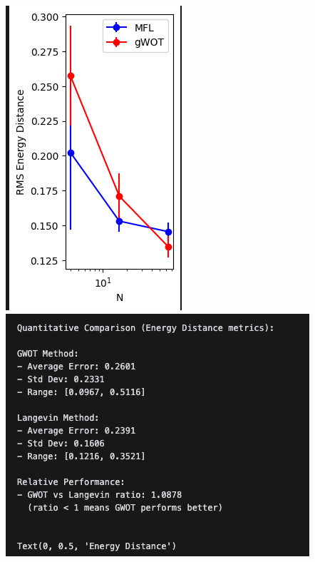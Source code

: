 \documentclass{article}
\begin{document}
\includegraphics[width=\textwidth, height=\textheight]{Smooth Schrodinger Bridges/benchmark-results/LangevinNativePlot3.png}
\includegraphics[width=\textwidth, height=0.4\textheight]{Smooth Schrodinger Bridges/benchmark-results/LangevinNativeQuant.png}
\end{document}
